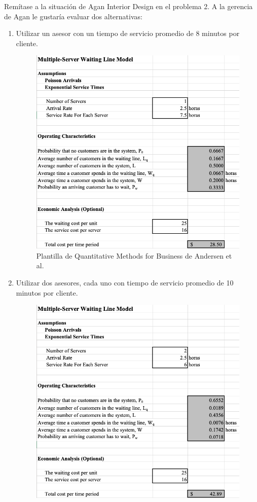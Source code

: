 \begin{problema}
	Remítase a la situación de Agan Interior Design en el problema 2. A la gerencia de Agan le gustaría evaluar dos alternativas:
	\begin{enumerate}
		\item Utilizar un asesor con un tiempo de servicio promedio de 8 minutos por cliente.
		\begin{figure}[H]
			\centering
			\includegraphics[scale=0.4]{Images/6}
			\caption{Plantilla de Quantitative Methods for Business de Andersen et al. }
		\end{figure}
		\item Utilizar dos asesores, cada uno con tiempo de servicio promedio de 10 minutos por cliente.
		\begin{figure}[H]
			\centering
			\includegraphics[scale=0.4]{Images/7}

\end{figure}
\end{enumerate}
\end{problema}
